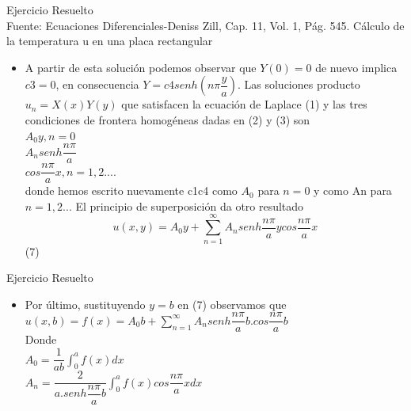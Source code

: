 \documentclass[11pt]{beamer}
\begin{document}
\begin{frame}{Ejercicio Resuelto\\
}{Fuente: Ecuaciones Diferenciales-Deniss Zill, Cap. 11, Vol. 1, Pág. 545.
Cálculo de la temperatura u en una placa rectangular}


  \begin{itemize}
  \item
   A partir de esta solución podemos observar que $Y(0)=0$ de nuevo implica $c3=0$, en
consecuencia $Y=c4senh(n\pi\dfrac{y}{a})$.
Las soluciones producto $u_{n}=X(x)Y(y)$ que satisfacen la ecuación de Laplace (1) y las
tres condiciones de frontera homogéneas dadas en (2) y (3) son\\
$A_{0}y, n=0$\\
$A_{n}senh\dfrac{n\pi}{a}$\\
$cos\dfrac{n\pi}{a}x, n=1,2....$\\
donde hemos escrito nuevamente c1c4 como $A_{0}$ para $n=0$ y como An para $n=1,2...$
El principio de superposición da otro resultado\\
$$u(x,y)=A_{0}y+\sum^{\infty}_{n=1}A_{n}senh\dfrac{n\pi}{a}ycos\dfrac{n\pi}{a}x$$ (7)\\


    
  \end{itemize}
\end{frame}

\begin{frame}{Ejercicio Resuelto\\
}
  \begin{itemize}
  \item
   Por último, sustituyendo $y=b$ en (7) observamos que
$u(x,b)=f(x)=A_{0}b+\sum^{\infty}_{n=1}A_{n}senh\dfrac{n\pi}{a}b.cos\dfrac{n\pi}{a}b$\\
Donde\\
$A_{0}=\dfrac{1}{ab}\int_{0}^{a}f(x)dx$\\
$A_{n}=\dfrac{2}{a.senh\dfrac{n\pi}{a}b}\int^{a}_{0}f(x)cos\dfrac{n\pi}{a}xdx$    
  \end{itemize}
\end{frame}
\end{document}
